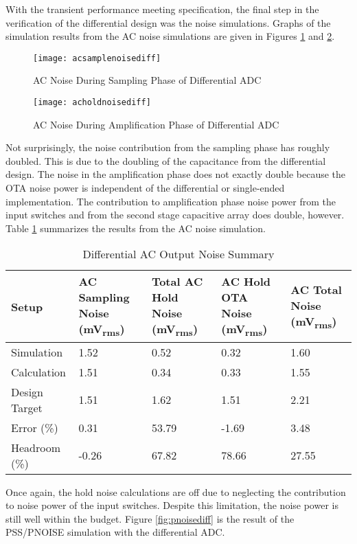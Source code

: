 With the transient performance meeting specification, the final step in the verification of the differential design was the noise simulations. Graphs of the simulation results from the AC noise simulations are given in Figures \ref{fig:acsamplenoisediff} and \ref{fig:acholdnoisediff}. 
\begin{figure}[htbp]
\centering
\texttt{[image: acsamplenoisediff]}
\caption{AC Noise During Sampling Phase of Differential ADC} 
\label{fig:acsamplenoisediff}
\end{figure}
\begin{figure}[htbp]
\centering
\texttt{[image: acholdnoisediff]}
\caption{AC Noise During Amplification Phase of Differential ADC} 
\label{fig:acholdnoisediff}
\end{figure}
Not surprisingly, the noise contribution from the sampling phase has roughly doubled. This is due to the doubling of the capacitance from the differential design. The noise in the amplification phase does not exactly double because the OTA noise power is independent of the differential or single-ended implementation. The contribution to amplification phase noise power from the input switches and from the second stage capacitive array does double, however. Table \ref{tab:acnoisesummarydiff} summarizes the results from the AC noise simulation.
\begin{table}[htbp]
\begin{center}
\begin{tabularx}{\linewidth}{|l|X|X|X|X|}
\hline
Setup & AC Sampling Noise (\si{\milli\volt_{rms}}) & Total AC Hold Noise  (\si{\milli\volt_{rms}}) & AC Hold OTA Noise  (\si{\milli\volt_{rms}}) & AC Total Noise  (\si{\milli\volt_{rms}}) \\ \hline
Simulation & 1.52 & 0.52 & 0.32 & 1.60 \\ \hline
Calculation & 1.51 & 0.34 & 0.33 & 1.55 \\ \hline
Design Target & 1.51 & 1.62 & 1.51 & 2.21 \\ \hline
Error (\%) & 0.31 & 53.79 & -1.69 & 3.48 \\ \hline
Headroom (\%) & -0.26 & 67.82 & 78.66 & 27.55 \\ \hline
\end{tabularx}
\end{center}
\caption{Differential AC Output Noise Summary}
\label{tab:acnoisesummarydiff}
\end{table}
Once again, the hold noise calculations are off due to neglecting the contribution to noise power of the input switches. Despite this limitation, the noise power is still well within the budget. Figure \ref{fig:pnoisediff} is the result of the PSS/PNOISE simulation with the differential ADC.
